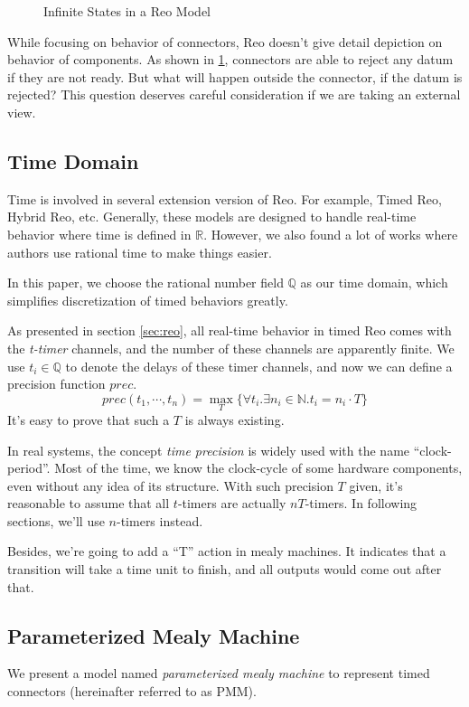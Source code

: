 \documentclass[conference, a4paper]{IEEEtran}
\begin{document}

\begin{figure}[h]
  \caption{Infinite States in a Reo Model}
  \label{fig:reoinfinite}
\end{figure}

While focusing on behavior of connectors, Reo doesn't give detail depiction on behavior of
components. As shown in \figurename \ref{fig:reoinfinite}, connectors are able to reject any datum
if they are not ready. But what will happen outside the connector, if the datum is rejected? This
question deserves careful consideration if we are taking an external view.

\subsection{Time Domain}
Time is involved in several extension version of Reo. For example, Timed
Reo\cite{DBLP:conf/sefm/ArbabBBR04}, Hybrid Reo\cite{DBLP:conf/icfem/ChenSS14}, etc.
Generally, these models are designed to handle real-time behavior where time is defined in
$\mathbb{R}$. However, we also found a lot of works where authors use rational time to make things
easier.

In this paper, we choose the rational number field $\mathbb{Q}$ as our time domain, which simplifies
discretization of timed behaviors greatly.

As presented in section \ref{sec:reo}, all real-time behavior in timed Reo comes with the
\emph{t-timer} channels, and the number of these channels are apparently finite. We use
$t_i\in\mathbb{Q}$ to denote the delays of these timer channels, and now we can define a precision
function $prec$.
\[
prec(t_1,\cdots,t_n) = \max_T\{\forall t_i.\exists n_i\in\mathbb{N}.t_i=n_i\cdot T\}
\]
It's easy to prove that such a $T$ is always existing.

In real systems, the concept \emph{time precision} is widely used with the name ``clock-period''.
Most of the time, we know the clock-cycle of some hardware components, even without any idea of its
structure. With such precision $T$ given, it's reasonable to assume that all $t$-timers are actually
$nT$-timers. In following sections, we'll use $n$-timers instead.

Besides, we're going to add a ``T'' action in mealy machines. It indicates that a transition
will take a time unit to finish, and all outputs would come out after that.

\subsection{Parameterized Mealy Machine}
We present a model named \emph{parameterized mealy machine} to represent timed connectors
(hereinafter referred to as PMM). 
\end{document}
